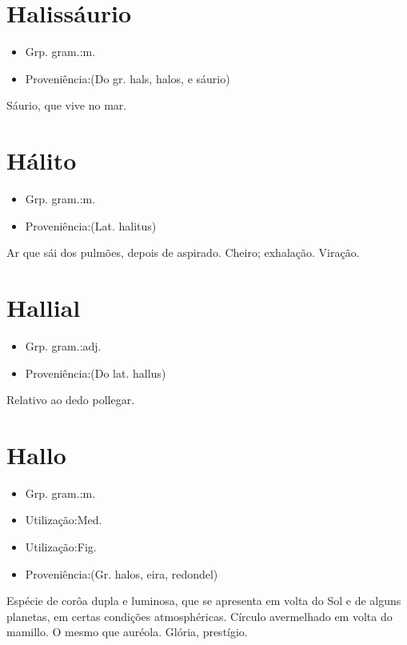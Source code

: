 \documentclass{article}
\begin{document}
\section{Halissáurio}
\begin{itemize}
\item {Grp. gram.:m.}
\end{itemize}
\begin{itemize}
\item {Proveniência:(Do gr. \textunderscore hals\textunderscore , \textunderscore halos\textunderscore , e \textunderscore sáurio\textunderscore )}
\end{itemize}
Sáurio, que vive no mar.
\section{Hálito}
\begin{itemize}
\item {Grp. gram.:m.}
\end{itemize}
\begin{itemize}
\item {Proveniência:(Lat. \textunderscore halitus\textunderscore )}
\end{itemize}
Ar que sái dos pulmões, depois de aspirado.
Cheiro; exhalação.
Viração.
\section{Hallial}
\begin{itemize}
\item {Grp. gram.:adj.}
\end{itemize}
\begin{itemize}
\item {Proveniência:(Do lat. \textunderscore hallus\textunderscore )}
\end{itemize}
Relativo ao dedo pollegar.
\section{Hallo}
\begin{itemize}
\item {Grp. gram.:m.}
\end{itemize}
\begin{itemize}
\item {Utilização:Med.}
\end{itemize}
\begin{itemize}
\item {Utilização:Fig.}
\end{itemize}
\begin{itemize}
\item {Proveniência:(Gr. \textunderscore halos\textunderscore , eira, redondel)}
\end{itemize}
Espécie de corôa dupla e luminosa, que se apresenta em volta do Sol e de alguns planetas, em certas condições atmosphéricas.
Círculo avermelhado em volta do mamillo.
O mesmo que \textunderscore auréola\textunderscore .
Glória, prestígio.
\end{document}
